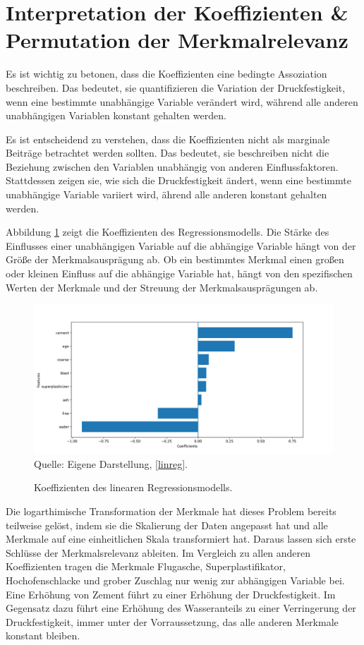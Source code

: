 \section{Interpretation der Koeffizienten \& Permutation der Merkmalrelevanz}

Es ist wichtig zu betonen, dass die Koeffizienten eine bedingte Assoziation beschreiben. 
Das bedeutet, sie quantifizieren die Variation der Druckfestigkeit, wenn eine bestimmte unabhängige Variable 
verändert wird, während alle anderen unabhängigen Variablen konstant gehalten werden.

Es ist entscheidend zu verstehen, dass die Koeffizienten nicht als marginale Beiträge betrachtet werden sollten. 
Das bedeutet, sie beschreiben nicht die Beziehung zwischen den Variablen unabhängig von anderen Einflussfaktoren. 
Stattdessen zeigen sie, wie sich die Druckfestigkeit ändert, wenn eine bestimmte unabhängige Variable variiert wird, 
ährend alle anderen konstant gehalten werden.

Abbildung \ref{pic:coef} zeigt die Koeffizienten des Regressionsmodells. Die Stärke des Einflusses einer 
unabhängigen Variable auf die abhängige Variable hängt von der Größe der Merkmalsausprägung ab. 
Ob ein bestimmtes Merkmal einen großen oder kleinen Einfluss auf die abhängige Variable hat, hängt
von den spezifischen Werten der Merkmale und der Streuung der Merkmalsausprägungen ab. 

\begin{figure}[!h]
    \caption{Koeffizienten des linearen Regressionsmodells.}
    \includegraphics[width=1\textwidth]{../scripts/images/coef.png}
    Quelle: Eigene Darstellung, \ref{linreg}.
    \label{pic:coef}
\end{figure}

Die logarthimische Transformation der Merkmale hat dieses Problem bereits 
teilweise gelöst, indem sie die Skalierung der Daten angepasst hat und alle Merkmale auf eine einheitlichen Skala transformiert hat.
Daraus lassen sich erste Schlüsse der Merkmalsrelevanz ableiten. Im Vergleich zu allen anderen 
Koeffizienten tragen die Merkmale Flugasche, Superplastifikator, Hochofenschlacke und grober Zuschlag nur wenig zur abhängigen
Variable bei. Eine Erhöhung von Zement führt zu einer Erhöhung der Druckfestigkeit. Im Gegensatz dazu führt eine Erhöhung des Wasseranteils 
zu einer Verringerung der Druckfestigkeit, immer unter der Vorraussetzung, das alle
anderen Merkmale konstant bleiben.

